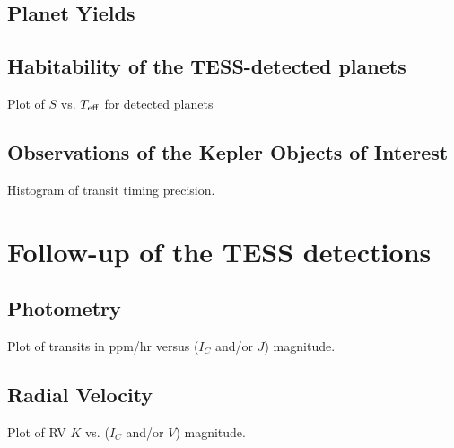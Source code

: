 \documentclass[preprint]{aastex}
\def \teff {T_{\rm eff}}
\begin{document}
\subsection{Planet Yields}
\subsection{Habitability of the TESS-detected planets}
Plot of $S$ vs. $\teff$ for detected planets
\subsection{Observations of the Kepler Objects of Interest}
Histogram of transit timing precision.

\section{Follow-up of the TESS detections}
\subsection{Photometry}
Plot of transits in ppm/hr versus ($I_C$ and/or $J$) magnitude.
\subsection{Radial Velocity}
Plot of RV $K$ vs. ($I_C$ and/or $V$) magnitude.



\acknowledgements

\clearpage
\end{document}
